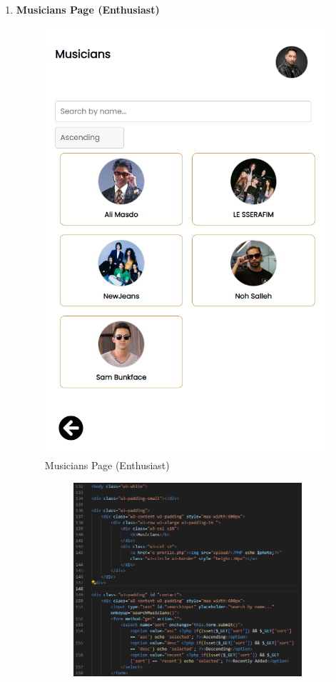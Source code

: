 \begin{enumerate}[1.]
    \item \textbf{Musicians Page (Enthusiast)}
    \begin{figure}[h]
        \centering
        \includegraphics[width=0.5\linewidth]{mainmatter/images/frontend/ss/Musicians (Enthusiast).png}
        \caption{Musicians Page (Enthusiast)}
        \label{fig:myfig70}
    \end{figure}
    \begin{figure}[h]\ContinuedFloat
        \centering
        \begin{subfigure}[b]{0.7\textwidth}
            \centering
            \includegraphics[width=\textwidth]{mainmatter/images/frontend/code/eallmusic.png}

\end{subfigure}
\end{figure}
\end{enumerate}
